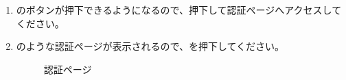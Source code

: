 \begin{enumerate}
            \newpage
            \item {}のボタンが押下できるようになるので、押下して認証ページへアクセスしてください。
            \item {}のような認証ページが表示されるので、を押下してください。
                \begin{figure}[htbp]
                    \centering
                    \caption{認証ページ}
                    \label{img:spotify13}
                \end{figure}


\end{enumerate}
